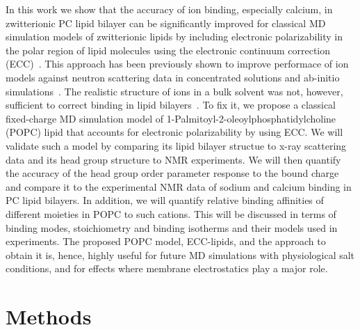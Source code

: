 \documentclass[aip,jcp,twocolumn]{revtex4}
\begin{document}

In this work we show that the accuracy of ion binding, especially calcium,
in zwitterionic PC lipid bilayer can be significantly improved 
for classical MD simulation models of zwitterionic lipids
by including electronic polarizability
in the polar region of lipid molecules
using the electronic continuum correction (ECC)~\cite{leontyev11}. 
This approach has been previously shown to improve performace of
ion models against neutron scattering data in concentrated solutions 
and ab-initio simulations~\cite{Jungwirth2017,Jungwirth2015,kohagen14,kohagen16}. 
The realistic structure of ions in a bulk solvent was not, however, sufficient to correct binding in lipid
bilayers~\cite{catte16}. 
To fix it, we propose
a classical fixed-charge MD simulation model of 
1-Palmitoyl-2-oleoylphosphatidylcholine (POPC) lipid 
that accounts for electronic polarizability by using ECC. 
We will validate such a model by comparing its lipid bilayer structue
to x-ray scattering data and its head group structure to NMR experiments. 
We will then quantify the accuracy of the head group order parameter response to the bound charge
and compare it to the experimental NMR data of sodium and calcium binding in PC lipid bilayers. 
In addition, we will quantify relative binding affinities of different moieties in POPC to such cations. 
This will be discussed in terms of binding modes, stoichiometry and binding isotherms and their models used in experiments.
The proposed POPC model, ECC-lipids, and the approach to obtain it
is, hence, highly useful for future MD simulations with physiological salt conditions, 
and for effects where membrane electrostatics play a major role.




\section{Methods}
\end{document}
